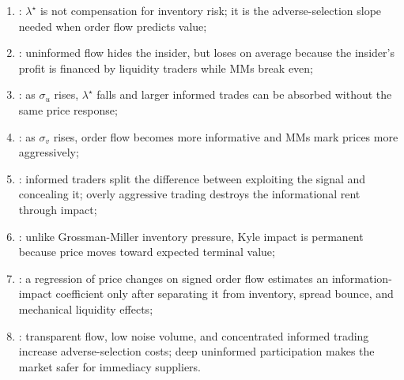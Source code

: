 \begin{model}
\par\smallskip\noindent{}
\begin{enumerate}[label=\roman*.]
\setlength{\itemsep}{0pt}
\item {}: $\lambda^\star$ is not compensation for inventory risk; it is the adverse-selection slope needed when order flow predicts value;
\item {}: uninformed flow hides the insider, but loses on average because the insider's profit is financed by liquidity traders while MMs break even;
\item {}: as $\sigma_u$ rises, $\lambda^\star$ falls and larger informed trades can be absorbed without the same price response;
\item {}: as $\sigma_v$ rises, order flow becomes more informative and MMs mark prices more aggressively;
\item {}: informed traders split the difference between exploiting the signal and concealing it; overly aggressive trading destroys the informational rent through impact;
\item {}: unlike Grossman-Miller inventory pressure, Kyle impact is permanent because price moves toward expected terminal value;
\item {}: a regression of price changes on signed order flow estimates an information-impact coefficient only after separating it from inventory, spread bounce, and mechanical liquidity effects;
\item {}: transparent flow, low noise volume, and concentrated informed trading increase adverse-selection costs; deep uninformed participation makes the market safer for immediacy suppliers.
\end{enumerate}
\end{model}

